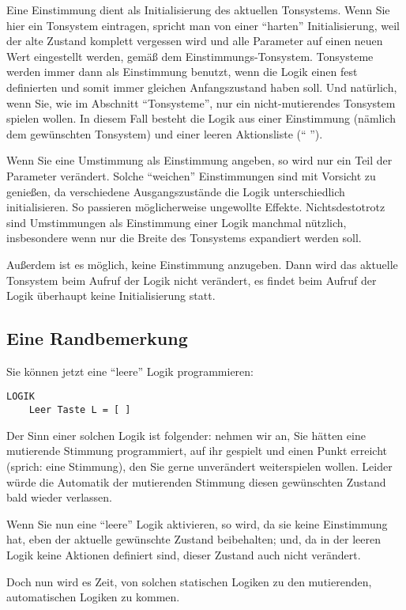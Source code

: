 Eine Einstimmung dient als Initialisierung des aktuellen Tonsystems.
Wenn Sie hier ein Tonsystem eintragen, spricht man von einer
"`harten"' Initialisierung, weil der alte Zustand komplett vergessen
wird und alle Parameter auf einen neuen Wert eingestellt werden, gemäß
dem Einstimmungs-Tonsystem. Tonsysteme werden immer dann als
Einstimmung benutzt, wenn die Logik einen fest definierten und somit
immer gleichen Anfangszustand haben soll.  Und natürlich, wenn Sie,
wie im Abschnitt "`Tonsysteme"', nur ein nicht-mutierendes Tonsystem
spielen wollen. In diesem Fall besteht die Logik aus einer Einstimmung
(nämlich dem gewünschten Tonsystem) und einer leeren Aktionsliste ("`
\sourcecode{[ ] } "').

Wenn Sie eine Umstimmung als Einstimmung angeben, so wird nur ein Teil
der Parameter verändert. Solche "`weichen"' Einstimmungen sind mit
Vorsicht zu genießen, da verschiedene Ausgangszustände die Logik
unterschiedlich initialisieren. So passieren möglicherweise ungewollte
Effekte. Nichtsdestotrotz sind Umstimmungen als Einstimmung einer
Logik manchmal nützlich, insbesondere wenn nur die Breite des
Tonsystems expandiert werden soll.

Außerdem ist es möglich, keine Einstimmung anzugeben. Dann wird
das aktuelle Tonsystem beim Aufruf der Logik nicht verändert, es
findet beim Aufruf der Logik überhaupt keine Initialisierung
statt.

\subsection{Eine Randbemerkung}\label{sec:eine-randbemerkung}

Sie können jetzt eine "`leere"' Logik programmieren:
\begin{verbatim}
LOGIK
    Leer Taste L = [ ]
\end{verbatim}
Der Sinn einer solchen Logik ist folgender: nehmen wir an, Sie
hätten eine mutierende Stimmung programmiert, auf ihr gespielt und
einen Punkt erreicht (sprich: eine Stimmung), den Sie gerne
unverändert weiterspielen wollen. Leider würde die Automatik der
mutierenden Stimmung diesen gewünschten Zustand bald wieder verlassen.

Wenn Sie nun eine "`leere"' Logik aktivieren, so wird, da sie keine
Einstimmung hat, eben der aktuelle gewünschte Zustand beibehalten;
und, da in der leeren Logik keine Aktionen definiert sind, dieser
Zustand auch nicht verändert.

Doch nun wird es Zeit, von solchen statischen Logiken zu den
mutierenden, automatischen Logiken zu kommen.

